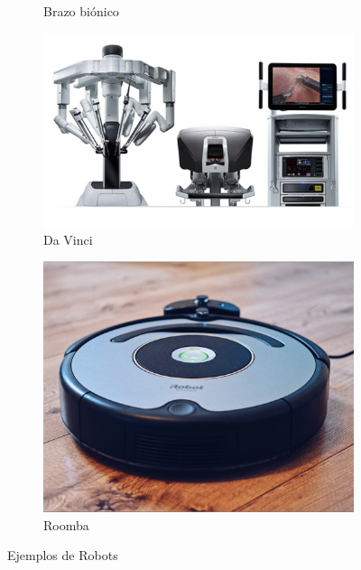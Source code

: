 \begin{figure}[H]
\begin{subfigure}[b]{0.3\textwidth}
    \caption{Brazo biónico}
    \label{fig:f4}
  \end{subfigure}
  \hfill
   \begin{subfigure}[b]{0.3\textwidth}
    \includegraphics[width=\textwidth, height=\textwidth]{chapters/images/davinci.png}
    \caption{Da Vinci \cite{davinci} }
    \label{fig:f5}
  \end{subfigure}
  \hfill
   \begin{subfigure}[b]{0.3\textwidth}
    \includegraphics[width=\textwidth, height=\textwidth]{chapters/images/roomba.png}
    \caption{Roomba}
    \label{fig:f6}
  \end{subfigure}
  \caption{Ejemplos de Robots}
\end{figure}

